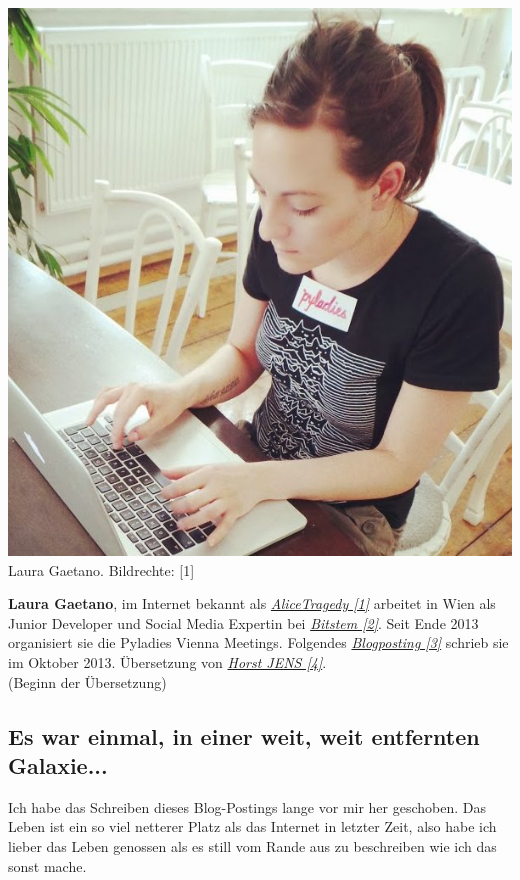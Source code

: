 \begin{center}
\includegraphics[width=\linewidth]{laura/laura-sitting.jpg}
\footnotesize{Laura Gaetano. Bildrechte: [1]}
\end{center}

\textbf{Laura Gaetano}, im Internet bekannt als \href{http://www.alicetragedy.org/blog/}{\textit{AliceTragedy [1]}} arbeitet in Wien als Junior Developer und Social Media Expertin bei \href{http://bitstem.com}{\textit{Bitstem [2]}}. Seit Ende 2013 organisiert sie die Pyladies Vienna Meetings. Folgendes \href{http://www.alicetragedy.org/blog/?p=6271}{\textit{Blogposting [3]}} schrieb sie im Oktober 2013. Übersetzung von \href{http://spielend-programmieren.at}{\textit{Horst JENS [4]}}. \\

(Beginn der Übersetzung) \\

\subsection*{Es war einmal, in einer weit, weit entfernten Galaxie...}

Ich habe das Schreiben dieses Blog-Postings lange vor mir her geschoben. Das Leben ist ein so viel netterer Platz als das Internet in letzter Zeit, also habe ich lieber das Leben genossen als es still vom Rande aus zu beschreiben wie ich das sonst mache.

